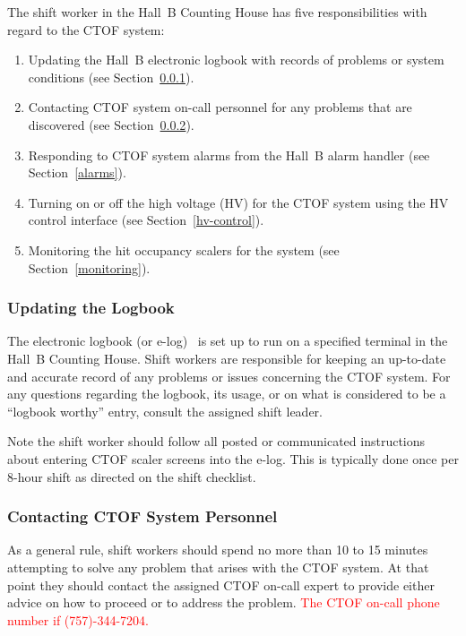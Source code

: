 \documentclass[12pt]{article}
\begin{document}
The shift worker in the Hall~B Counting House has five responsibilities with 
regard to the CTOF system:

\begin{enumerate}
\item Updating the Hall~B electronic logbook with records of problems or system 
conditions (see Section~\ref{logbook}).

\item Contacting CTOF system on-call personnel for any problems that are discovered 
(see Section~\ref{contact}).

\item Responding to CTOF system alarms from the Hall~B alarm handler (see 
Section~\ref{alarms}).

\item Turning on or off the high voltage (HV) for the CTOF system using the HV 
control interface (see Section~\ref{hv-control}).

\item Monitoring the hit occupancy scalers for the system (see Section~\ref{monitoring}).
\end{enumerate}

\subsubsection{Updating the Logbook}
\label{logbook}

The electronic logbook (or e-log)~\cite{e-log} is set up to run on a specified 
terminal in the Hall~B Counting House. Shift workers are responsible for keeping 
an up-to-date and accurate record of any problems or issues concerning the CTOF 
system. For any questions regarding the logbook, its usage, or on what is 
considered to be a ``logbook worthy'' entry, consult the assigned shift leader.

Note the shift worker should follow all posted or communicated instructions about 
entering CTOF scaler screens into the e-log. This is typically done once per 
8-hour shift as directed on the shift checklist.

\subsubsection{Contacting CTOF System Personnel}
\label{contact}

As a general rule, shift workers should spend no more than 10 to 15 minutes 
attempting to solve any problem that arises with the CTOF system. At that point 
they should contact the assigned CTOF on-call expert to provide either advice on 
how to proceed or to address the problem. \textcolor{red}{The CTOF on-call phone 
number if (757)-344-7204.}
\end{document}
